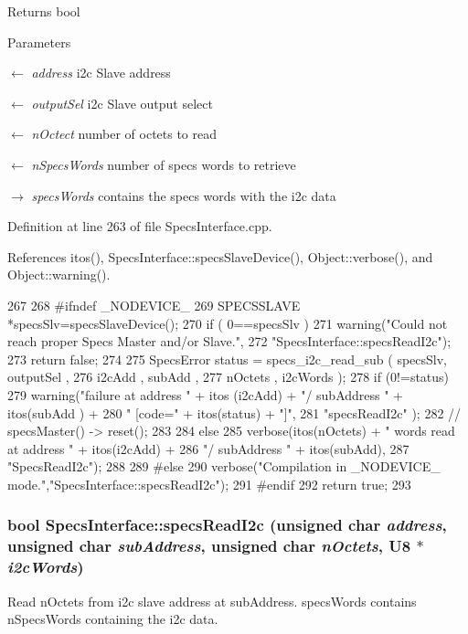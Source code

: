 \begin{DoxyReturn}{Returns}
bool 
\end{DoxyReturn}

\begin{DoxyParams}{Parameters}
\item[\mbox{$\leftarrow$} {\em address}]i2c Slave address \item[\mbox{$\leftarrow$} {\em outputSel}]i2c Slave output select \item[\mbox{$\leftarrow$} {\em nOctect}]number of octets to read \item[\mbox{$\leftarrow$} {\em nSpecsWords}]number of specs words to retrieve \item[\mbox{$\rightarrow$} {\em specsWords}]contains the specs words with the i2c data \end{DoxyParams}


Definition at line 263 of file SpecsInterface.cpp.

References itos(), SpecsInterface::specsSlaveDevice(), Object::verbose(), and Object::warning().


\begin{DoxyCode}
267                                              {
268 #ifndef _NODEVICE_
269   SPECSSLAVE *specsSlv=specsSlaveDevice();
270   if ( 0==specsSlv ){
271     warning("Could not reach proper Specs Master and/or Slave.",
272             "SpecsInterface::specsReadI2c");
273     return false;
274   }
275   SpecsError status = specs_i2c_read_sub ( specsSlv, outputSel ,
276                                            i2cAdd , subAdd , 
277                                            nOctets , i2cWords );
278   if (0!=status){
279     warning("failure at address " + itos (i2cAdd) + "/ subAddress " + itos(subAdd
      ) +
280             " [code=" + itos(status) + "]",
281             "specsReadI2c" );
282     //    specsMaster() -> reset();
283   }
284   else {
285     verbose(itos(nOctets) + " words read at address " + itos(i2cAdd) +
286             "/ subAddress " + itos(subAdd),
287             "SpecsReadI2c");
288   }
289 #else
290   verbose("Compilation in _NODEVICE_ mode.","SpecsInterface::specsReadI2c");
291 #endif
292   return true;
293 }
\end{DoxyCode}
\hypertarget{classSpecsInterface_acbc22fab91e3dbd33f83b324750baa1f}{
\subsubsection[{specsReadI2c}]{\setlength{\rightskip}{0pt plus 5cm}bool SpecsInterface::specsReadI2c (unsigned char {\em address}, \/  unsigned char {\em subAddress}, \/  unsigned char {\em nOctets}, \/  {\bf U8} $\ast$ {\em i2cWords})}}
\label{classSpecsInterface_acbc22fab91e3dbd33f83b324750baa1f}
Read nOctets from i2c slave address at subAddress. specsWords contains nSpecsWords containing the i2c data.

